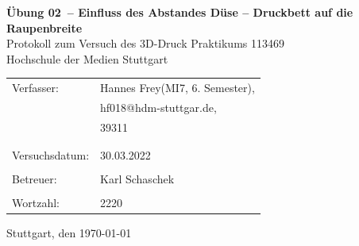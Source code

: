 \documentclass[a4paper,12pt,bibtotocnumbered]{scrartcl}
\makeatletter
\numberwithin{equation}{section} %
\newcommand{\VERSUCHSDATUM}{30.03.2022}
\newcommand{\PROTOKOLLDATUM}{\today}
\newcommand{\VerfasserEINS}{Hannes Frey}
\newcommand{\MatNoEINS}{39311}
\newcommand{\StudiengangEINS}{MI7}
\newcommand{\SemesterEINS}{6. Semester}
\newcommand{\MailEINS}{hf018@hdm-stuttgar.de}
\newcommand{\VerfasserZWEI}{Verfasser 2}
\newcommand{\MatNoZWEI}{Matrikelnummer 2}
\newcommand{\StudiengangZWEI}{Technologiemanagement}
\newcommand{\BETREUER}{Karl Schaschek}
\newcommand{\WORTZAHL}{2220}
\newcommand{\GRUPPENNR}{Z-999}
\newcommand{\VERSUCHSNR}{Übung 02}
\newcommand{\VERSUCHSNAME}{Einfluss des Abstandes Düse – Druckbett auf die Raupenbreite}
\makeatother
\begin{document}
\thispagestyle{empty}


\begin{titlepage}

\begin{center}
\Huge{\textbf{\VERSUCHSNR\ – \VERSUCHSNAME}}\\%
\vspace{10mm}%
\Large{Protokoll zum Versuch des 3D-Druck Praktikums 113469  %
}\\
\vspace{10mm} 
\Large{Hochschule der Medien Stuttgart}\\
\end{center}
\vspace{1cm}
\begin{center}
\begin{tabular}{ll}
\large{Verfasser:}		& \large{\VerfasserEINS\;(\StudiengangEINS, \SemesterEINS),} \\ 
						& \large{\MailEINS}, \\
 						& \large{\MatNoEINS} \\
						\vspace{0cm}\\
\vspace{0cm}\\
\large{Versuchsdatum:}	& \large{\VERSUCHSDATUM} \\
\vspace{0cm}\\
\large{Betreuer:}		& \large{\BETREUER} \\
\vspace{0cm}\\
\large{Wortzahl:}		& \large{\WORTZAHL}
\end{tabular}
\end{center}
\vspace{65mm}

\begin{center}
Stuttgart, den \PROTOKOLLDATUM
\end{center}

\end{titlepage}
\end{document}
